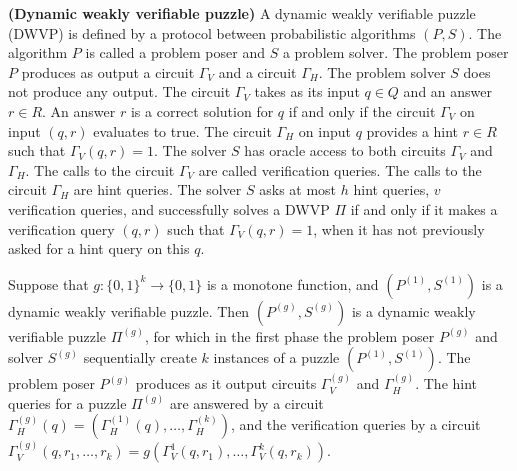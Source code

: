\begin{definition} {\textbf{(Dynamic weakly verifiable puzzle)}}
  A dynamic weakly verifiable puzzle (DWVP) is defined by a protocol between probabilistic algorithms $(P,S)$.
  The algorithm $P$ is called a problem poser and $S$ a problem solver.
  The problem poser $P$ produces as output a circuit $\Gamma_{V}$ and a circuit $\Gamma_{H}$.
  The problem solver $S$ does not produce any output.
  The circuit $\Gamma_{V}$ takes as its input $q \in Q$ and an answer $r \in R$.
  An answer $r$ is a correct solution for $q$ if and only if the circuit $\Gamma_V$ on input $(q,r)$ evaluates to true.
  The circuit $\Gamma_H$ on input $q$ provides a hint $r \in R$ such that $\Gamma_V(q,r) = 1$.
  The solver $S$ has oracle access to both circuits $\Gamma_V$ and $\Gamma_H$.
  The calls to the circuit $\Gamma_V$ are called verification queries. The calls to the circuit $\Gamma_H$ are hint queries.
  The solver $S$ asks at most $h$ hint queries, $v$ verification queries, and successfully solves a DWVP $\Pi$ if and only if
  it makes a verification query $(q,r)$ such that $\Gamma_V(q,r) = 1$, when it has not previously asked for a hint query on this $q$.
\end{definition}
%
%
Suppose that $g: \{0,1\}^k \rightarrow \{0,1\}$ is a monotone function, and $\left( P^{(1)}, S^{(1)} \right)$ is a dynamic weakly verifiable puzzle.
Then $(P^{(g)}, S^{(g)})$ is a dynamic weakly verifiable puzzle $\Pi^{(g)}$, for which in the first phase the problem poser $P^{(g)}$ and solver $S^{(g)}$
sequentially create $k$ instances of a puzzle $\left( P^{(1)}, S^{(1)}\right)$. The problem poser $P^{(g)}$ produces as it output circuits $\Gamma_V^{(g)}$ and $\Gamma_H^{(g)}$.
The hint queries for a puzzle $\Pi^{(g)}$ are answered by a circuit $\Gamma_H^{(g)}(q) = \left( \Gamma_H^{(1)}(q), \dots, \Gamma_H^{(k)} \right)$, and the verification queries by a circuit $\Gamma_V^{(g)}(q, r_1, \dots, r_k) = g \left( \Gamma_V^{1}(q, r_1), \dots, \Gamma_V^{k}(q, r_k) \right)$.

